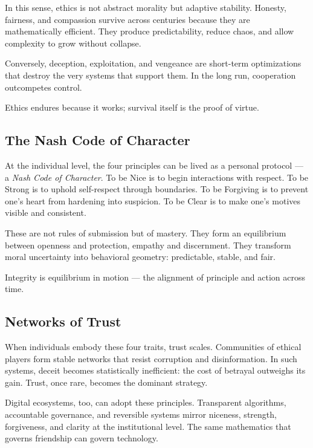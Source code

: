 \documentclass[12pt,twoside]{book}
\begin{document}
In this sense, ethics is not abstract morality but adaptive stability.  
Honesty, fairness, and compassion survive across centuries because they are mathematically efficient.  
They produce predictability, reduce chaos, and allow complexity to grow without collapse.  

Conversely, deception, exploitation, and vengeance are short-term optimizations that destroy the very systems that support them.  
In the long run, cooperation outcompetes control.\\

\begin{keyidea}
Ethics endures because it works; survival itself is the proof of virtue.
\end{keyidea}

\subsection*{The Nash Code of Character}

At the individual level, the four principles can be lived as a personal protocol --- a \emph{Nash Code of Character}.  
To be Nice is to begin interactions with respect.  
To be Strong is to uphold self-respect through boundaries.  
To be Forgiving is to prevent one’s heart from hardening into suspicion.  
To be Clear is to make one’s motives visible and consistent.  

These are not rules of submission but of mastery.  
They form an equilibrium between openness and protection, empathy and discernment.  
They transform moral uncertainty into behavioral geometry: predictable, stable, and fair.\\

\begin{keyidea}
Integrity is equilibrium in motion --- the alignment of principle and action across time.
\end{keyidea}

\subsection*{Networks of Trust}

When individuals embody these four traits, trust scales.  
Communities of ethical players form stable networks that resist corruption and disinformation.  
In such systems, deceit becomes statistically inefficient: the cost of betrayal outweighs its gain.  
Trust, once rare, becomes the dominant strategy.  

Digital ecosystems, too, can adopt these principles.  
Transparent algorithms, accountable governance, and reversible systems mirror niceness, strength, forgiveness, and clarity at the institutional level.  
The same mathematics that governs friendship can govern technology.
\end{document}
